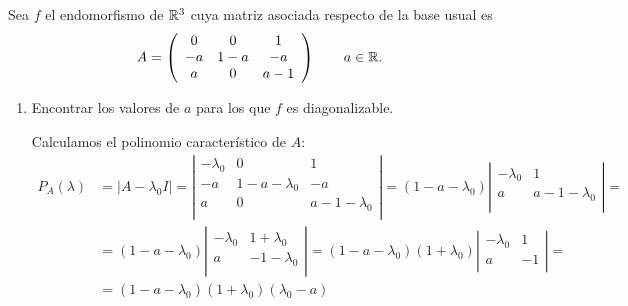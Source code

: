 \documentclass[12pt]{article}
\begin{document}
    \begin{ejercicio} [6 ptos] Sea $f$ el endomorfismo de $\mathbb{R}^3$ cuya matriz asociada respecto de la base usual es
    \begin{equation*}
        A = \left( \begin{array}{ccc}
            0 & 0 & 1 \\
            -a & 1-a & -a\\
            a & 0 & a-1
        \end{array}\right) \qquad  a\in \mathbb{R}.
    \end{equation*}
    \begin{enumerate}
        \item Encontrar los valores de $a$ para los que $f$ es diagonalizable.


        Calculamos el polinomio característico de $A$:
        \begin{equation*}\begin{split}
                P_{A}(\lambda) & = |A-\lambda_0 I| = \left| \begin{array}{ccc}
                -\lambda_0 & 0 & 1 \\
                -a & 1-a-\lambda_0 & -a \\
                a & 0 & a-1-\lambda_0 \\
                \end{array}\right|
                =
                (1-a-\lambda_0) \left| \begin{array}{cc}
                -\lambda_0 & 1 \\
                a & a-1-\lambda_0 \\
                \end{array}\right|
                =\\&
                =
                (1-a-\lambda_0) \left| \begin{array}{cc}
                -\lambda_0 & 1+\lambda_0 \\
                a & -1-\lambda_0 \\
                \end{array}\right|
                =
                (1-a-\lambda_0)(1+\lambda_0)\left| \begin{array}{cc}
                -\lambda_0 & 1 \\
                a & -1 \\
                \end{array}\right|
                =\\&=
                (1-a-\lambda_0)(1+\lambda_0)(\lambda_0-a)
            \end{split}\end{equation*}


\end{enumerate}
\end{ejercicio}
\end{document}
